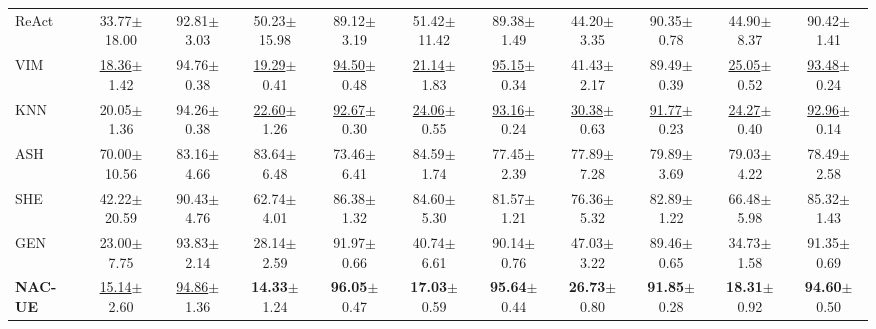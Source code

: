 \documentclass{article} \usepackage{iclr2024_conference,times}
\begin{document}
\begin{table*}
{\begin{tabular}{l cc cc cc cc cc}
ReAct & 33.77{\tiny$\pm$18.00} & 92.81{\tiny$\pm$3.03} & 50.23{\tiny$\pm$15.98} & 89.12{\tiny$\pm$3.19} & 51.42{\tiny$\pm$11.42} & 89.38{\tiny$\pm$1.49} & 44.20{\tiny$\pm$3.35} & 90.35{\tiny$\pm$0.78} & 44.90{\tiny$\pm$8.37} & 90.42{\tiny$\pm$1.41} \\ 
VIM & \underline{18.36}{\tiny$\pm$1.42} & 94.76{\tiny$\pm$0.38} & \underline{19.29}{\tiny$\pm$0.41} & \underline{94.50}{\tiny$\pm$0.48} & \underline{21.14}{\tiny$\pm$1.83} & \underline{95.15}{\tiny$\pm$0.34} & 41.43{\tiny$\pm$2.17} & 89.49{\tiny$\pm$0.39} & \underline{25.05}{\tiny$\pm$0.52} & \underline{93.48}{\tiny$\pm$0.24} \\ 
			KNN & 20.05{\tiny$\pm$1.36} & 94.26{\tiny$\pm$0.38} & \underline{22.60}{\tiny$\pm$1.26} & \underline{92.67}{\tiny$\pm$0.30} & \underline{24.06}{\tiny$\pm$0.55} & \underline{93.16}{\tiny$\pm$0.24} & \underline{30.38}{\tiny$\pm$0.63} & \underline{91.77}{\tiny$\pm$0.23} & \underline{24.27}{\tiny$\pm$0.40} & \underline{92.96}{\tiny$\pm$0.14} \\ 
ASH & 70.00{\tiny$\pm$10.56} & 83.16{\tiny$\pm$4.66} & 83.64{\tiny$\pm$6.48} & 73.46{\tiny$\pm$6.41} & 84.59{\tiny$\pm$1.74} & 77.45{\tiny$\pm$2.39} & 77.89{\tiny$\pm$7.28} & 79.89{\tiny$\pm$3.69} & 79.03{\tiny$\pm$4.22} & 78.49{\tiny$\pm$2.58} \\ 
			SHE & 42.22{\tiny$\pm$20.59} & 90.43{\tiny$\pm$4.76} & 62.74{\tiny$\pm$4.01} & 86.38{\tiny$\pm$1.32} & 84.60{\tiny$\pm$5.30} & 81.57{\tiny$\pm$1.21} & 76.36{\tiny$\pm$5.32} & 82.89{\tiny$\pm$1.22} & 66.48{\tiny$\pm$5.98} & 85.32{\tiny$\pm$1.43} \\ 
			GEN & 23.00{\tiny$\pm$7.75} & 93.83{\tiny$\pm$2.14} & 28.14{\tiny$\pm$2.59} & 91.97{\tiny$\pm$0.66} & 40.74{\tiny$\pm$6.61} & 90.14{\tiny$\pm$0.76} & 47.03{\tiny$\pm$3.22} & 89.46{\tiny$\pm$0.65} & 34.73{\tiny$\pm$1.58} & 91.35{\tiny$\pm$0.69} \\ 
			\rowcolor{LightGray}
			\textbf{NAC-UE} & \underline{15.14}{\tiny$\pm$2.60}  & \underline{94.86}{\tiny$\pm$1.36}  & \textbf{14.33}{\tiny$\pm$1.24}  & \textbf{96.05}{\tiny$\pm$0.47}  & \textbf{17.03}{\tiny$\pm$0.59}  & \textbf{95.64}{\tiny$\pm$0.44}  & \textbf{26.73}{\tiny$\pm$0.80}  &  \textbf{91.85}{\tiny$\pm$0.28}  & \textbf{18.31}{\tiny$\pm$0.92} &  \textbf{94.60}{\tiny$\pm$0.50} \\ 
			\midrule
			

\end{tabular}}
\end{table*}
\end{document}
